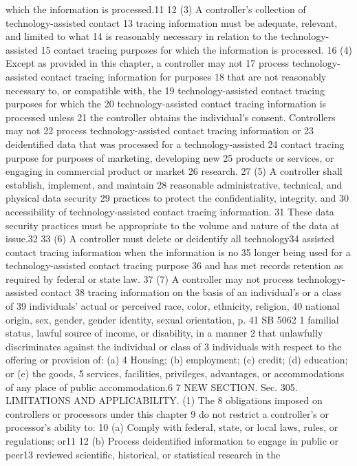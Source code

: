 which the information is processed.11
12 (3) A controller's collection of technology-assisted contact
13 tracing information must be adequate, relevant, and limited to what
14 is reasonably necessary in relation to the technology-assisted
15 contact tracing purposes for which the information is processed.
16 (4) Except as provided in this chapter, a controller may not
17 process technology-assisted contact tracing information for purposes
18 that are not reasonably necessary to, or compatible with, the
19 technology-assisted contact tracing purposes for which the
20 technology-assisted contact tracing information is processed unless
21 the controller obtains the individual's consent. Controllers may not
22 process technology-assisted contact tracing information or
23 deidentified data that was processed for a technology-assisted
24 contact tracing purpose for purposes of marketing, developing new
25 products or services, or engaging in commercial product or market
26 research.
27 (5) A controller shall establish, implement, and maintain
28 reasonable administrative, technical, and physical data security
29 practices to protect the confidentiality, integrity, and
30 accessibility of technology-assisted contact tracing information.
31 These data security practices must be appropriate to the volume and
nature of the data at issue.32
33 (6) A controller must delete or deidentify all technology34 assisted contact tracing information when the information is no
35 longer being used for a technology-assisted contact tracing purpose
36 and has met records retention as required by federal or state law.
37 (7) A controller may not process technology-assisted contact
38 tracing information on the basis of an individual's or a class of
39 individuals' actual or perceived race, color, ethnicity, religion,
40 national origin, sex, gender, gender identity, sexual orientation,
p. 41 SB 5062
1 familial status, lawful source of income, or disability, in a manner
2 that unlawfully discriminates against the individual or class of
3 individuals with respect to the offering or provision of: (a)
4 Housing; (b) employment; (c) credit; (d) education; or (e) the goods,
5 services, facilities, privileges, advantages, or accommodations of
any place of public accommodation.6
7 NEW SECTION. Sec. 305. LIMITATIONS AND APPLICABILITY. (1) The
8 obligations imposed on controllers or processors under this chapter
9 do not restrict a controller's or processor's ability to:
10 (a) Comply with federal, state, or local laws, rules, or
regulations; or11
12 (b) Process deidentified information to engage in public or peer13 reviewed scientific, historical, or statistical research in the
